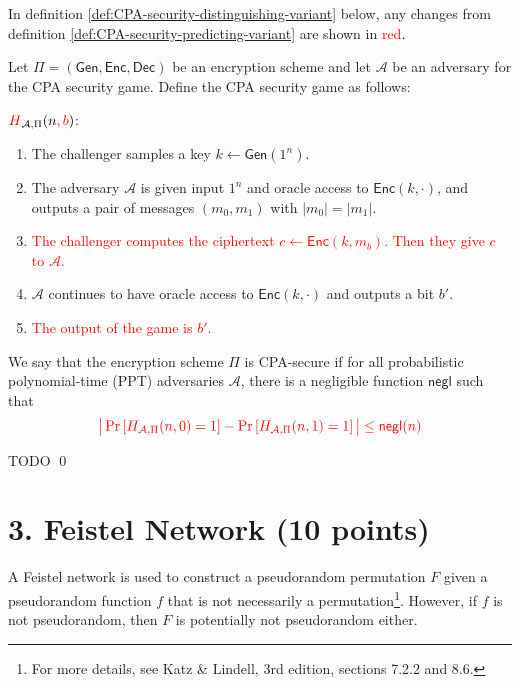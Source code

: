 \documentclass[11pt]{article}
\newenvironment{solution}{\noindent{\bf Solution}\hspace*{1em}}{\qed\medskip}
\newcommand{\Gen}{\mathsf{Gen}}
\newcommand{\Enc}{\mathsf{Enc}}
\newcommand{\Dec}{\mathsf{Dec}}
\newcommand{\A}{\mathcal{A}}
\newcommand{\negl}{\mathsf{negl}}
\begin{document}
In definition \ref{def:CPA-security-distinguishing-variant} below, any changes from definition \ref{def:CPA-security-predicting-variant} are shown in \textcolor{red}{red}.
\begin{definition}\label{def:CPA-security-distinguishing-variant}
Let $\Pi = (\Gen, \Enc, \Dec)$ be an encryption scheme and let $\A$ be an adversary for the CPA security game. Define the CPA security game as follows:\newline

\noindent\underline{$\textcolor{red}{H}_{\A, \Pi}(n\textcolor{red}{, b})$}:
\begin{enumerate}
    \item The challenger samples a key $k \leftarrow \Gen(1^n)$.
    \item The adversary $\A$ is given input $1^n$ and oracle access to $\Enc(k, \cdot)$, and outputs a pair of messages $(m_0, m_1)$ with $|m_0| = |m_1|$.
    \item \textcolor{red}{The challenger computes the ciphertext $c \leftarrow \Enc(k, m_b)$. Then they give $c$ to $\A$.}
    \item $\A$ continues to have oracle access to $\Enc(k, \cdot)$ and outputs a bit $b'$. 
    \item \textcolor{red}{The output of the game is $b'$.}
\end{enumerate}

We say that the encryption scheme $\Pi$ is CPA-secure if for all probabilistic polynomial-time (PPT) adversaries $\A$, there is a negligible function $\negl$ such that 
\[\textcolor{red}{\big|\Pr\left[H_{\A, \Pi}(n, 0) = 1\right] - \Pr\left[H_{\A, \Pi}(n, 1) = 1\right]\big| \leq \negl(n)}\]
\end{definition}

\begin{solution}
    TODO
\end{solution}
\pagebreak


\section*{3. Feistel Network (10 points)}

A Feistel network is used to construct a pseudorandom permutation $F$ given a pseudorandom function $f$ that is not necessarily a permutation\footnote{For more details, see Katz \& Lindell, 3rd edition, sections 7.2.2 and 8.6.}. However, if $f$ is not pseudorandom, then $F$ is potentially not pseudorandom either.
\end{document}
